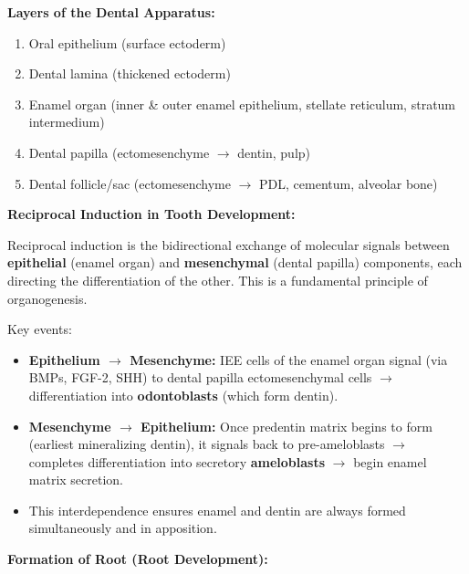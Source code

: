 \documentclass[11pt,a4paper]{article}
\begin{document}
\begin{ansbox}
\textbf{Layers of the Dental Apparatus:}
\begin{enumerate}[leftmargin=*]
    \item Oral epithelium (surface ectoderm)
    \item Dental lamina (thickened ectoderm)
    \item Enamel organ (inner \& outer enamel epithelium, stellate reticulum, stratum intermedium)
    \item Dental papilla (ectomesenchyme $\rightarrow$ dentin, pulp)
    \item Dental follicle/sac (ectomesenchyme $\rightarrow$ PDL, cementum, alveolar bone)
\end{enumerate}

\textbf{Reciprocal Induction in Tooth Development:}

Reciprocal induction is the bidirectional exchange of molecular signals between \textbf{epithelial} (enamel organ) and \textbf{mesenchymal} (dental papilla) components, each directing the differentiation of the other. This is a fundamental principle of organogenesis.

Key events:
\begin{itemize}[leftmargin=*]
    \item \textbf{Epithelium $\rightarrow$ Mesenchyme:} IEE cells of the enamel organ signal (via BMPs, FGF-2, SHH) to dental papilla ectomesenchymal cells $\rightarrow$ differentiation into \textbf{odontoblasts} (which form dentin).
    \item \textbf{Mesenchyme $\rightarrow$ Epithelium:} Once predentin matrix begins to form (earliest mineralizing dentin), it signals back to pre-ameloblasts $\rightarrow$ completes differentiation into secretory \textbf{ameloblasts} $\rightarrow$ begin enamel matrix secretion.
    \item This interdependence ensures enamel and dentin are always formed simultaneously and in apposition.
\end{itemize}

\textbf{Formation of Root (Root Development):}


\end{ansbox}
\end{document}
